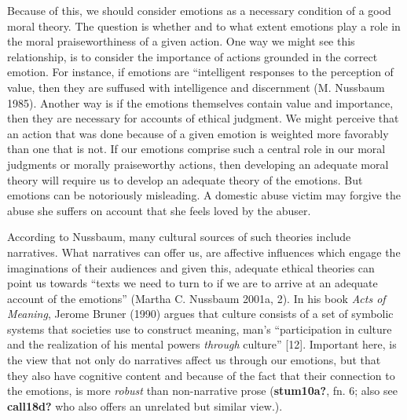 \documentclass[12pt]{book}
\theoremstyle{definition}
\theoremstyle{remark}
\begin{document}
Because of this, we should consider emotions as a necessary condition of a good moral theory. The question is whether and to what extent emotions play a role in the moral praiseworthiness of a given action. One way we might see this relationship, is to consider the importance of actions grounded in the correct emotion. For instance, if emotions are ``intelligent responses to the perception of value, then they are suffused with intelligence and discernment (M. Nussbaum 1985). Another way is if the emotions themselves contain value and importance, then they are necessary for accounts of ethical judgment. We might perceive that an action that was done because of a given emotion is weighted more favorably than one that is not. If our emotions comprise such a central role in our moral judgments or morally praiseworthy actions, then developing an adequate moral theory will require us to develop an adequate theory of the emotions. But emotions can be notoriously misleading. A domestic abuse victim may forgive the abuse she suffers on account that she feels loved by the abuser.

According to Nussbaum, many cultural sources of such theories include narratives. What narratives can offer us, are affective influences which engage the imaginations of their audiences and given this, adequate ethical theories can point us towards ``texts we need to turn to if we are to arrive at an adequate account of the emotions'' (Martha C. Nussbaum 2001a, 2). In his book \emph{Acts of Meaning}, Jerome Bruner (1990) argues that culture consists of a set of symbolic systems that societies use to construct meaning, man's ``participation in culture and the realization of his mental powers \emph{through} culture'' {[}12{]}. Important here, is the view that not only do narratives affect us through our emotions, but that they also have cognitive content and because of the fact that their connection to the emotions, is more \emph{robust} than non-narrative prose (\textbf{stum10a?}, fn. 6; also see \textbf{call18d?} who also offers an unrelated but similar view.).
\end{document}

